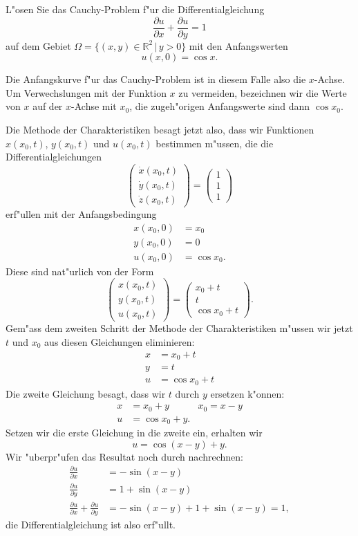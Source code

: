 L"osen Sie das Cauchy-Problem f"ur die Differentialgleichung
\[
\frac{\partial u}{\partial x}
+
\frac{\partial u}{\partial y}
=1
\]
auf dem Gebiet $\Omega = \{ (x,y)\in\mathbb R^2\,|\, y > 0\}$
mit den Anfangswerten
\[
u(x,0)=\cos x.
\]

\begin{loesung}
Die Anfangskurve f"ur das Cauchy-Problem ist in diesem Falle also die
$x$-Achse. Um Verwechslungen mit der Funktion $x$ zu vermeiden, bezeichnen
wir die Werte von $x$ auf der $x$-Achse mit $x_0$, die zugeh"origen
Anfangswerte sind dann $\cos x_0$. 

Die Methode der Charakteristiken besagt jetzt also, dass wir Funktionen
$x(x_0, t)$, $y(x_0,t)$ und $u(x_0,t)$ bestimmen m"ussen, die die
Differentialgleichungen
\[
\begin{pmatrix}
\dot x(x_0,t)\\
\dot y(x_0,t)\\
\dot z(x_0,t)
\end{pmatrix}
=\begin{pmatrix}
1\\1\\1
\end{pmatrix}
\]
erf"ullen mit der Anfangsbedingung
\begin{align*}
x(x_0,0)&=x_0\\
y(x_0,0)&=0\\
u(x_0,0)&=\cos x_0.
\end{align*}
Diese sind nat"urlich von der Form
\[
\begin{pmatrix}
x(x_0,t)\\
y(x_0,t)\\
u(x_0,t)
\end{pmatrix}
=
\begin{pmatrix}
x_0+t\\
t\\
\cos x_0 + t
\end{pmatrix}.
\]
Gem"ass dem zweiten Schritt der Methode der Charakteristiken m"ussen
wir jetzt $t$ und $x_0$ aus diesen Gleichungen eliminieren:
\begin{align*}
x&=x_0+t\\
y&=t\\
u&=\cos x_0 + t
\end{align*}
Die zweite Gleichung besagt, dass wir $t$ durch $y$ ersetzen k"onnen:
\begin{align*}
x&=x_0+y&x_0=x-y\\
u&=\cos x_0 + y.
\end{align*}
Setzen wir die erste Gleichung in die zweite ein, erhalten wir
\[
u=\cos(x-y)+y.
\]
Wir "uberpr"ufen das Resultat noch durch nachrechnen:
\begin{align*}
\frac{\partial u}{\partial x}
&=
-\sin(x-y)
\\
\frac{\partial u}{\partial y}
&=
1+\sin(x-y)
\\
\frac{\partial u}{\partial x}
+
\frac{\partial u}{\partial y}
&=
-\sin(x-y)
+
1+\sin(x-y)
=1,
\end{align*}
die Differentialgleichung ist also erf"ullt.
\end{loesung}

